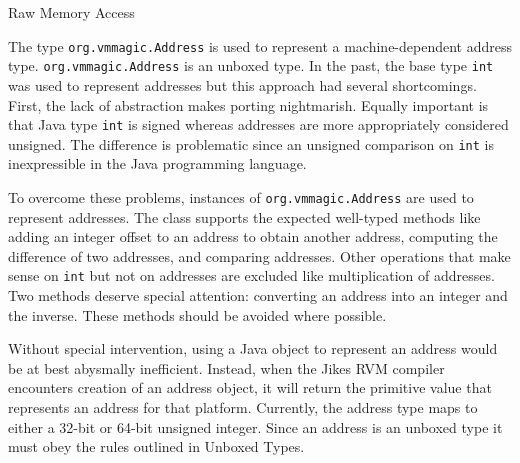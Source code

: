 \begin{section}{Raw Memory Access}
\label{sec:rawmemoryaccess}

The type \verb+org.vmmagic.Address+ is used to represent a machine-dependent address type. \verb+org.vmmagic.Address+ is an unboxed type. In the past, the base type \verb+int+ was used to represent addresses but this approach had several shortcomings. First, the lack of abstraction makes porting nightmarish. Equally important is that Java type \verb+int+ is signed whereas addresses are more appropriately considered unsigned. The difference is problematic since an unsigned comparison on \verb+int+ is inexpressible in the Java programming language.

To overcome these problems, instances of \verb+org.vmmagic.Address+ are used to represent addresses. The class supports the expected well-typed methods like adding an integer offset to an address to obtain another address, computing the difference of two addresses, and comparing addresses. Other operations that make sense on \verb+int+ but not on addresses are excluded like multiplication of addresses. Two methods deserve special attention: converting an address into an integer and the inverse. These methods should be avoided where possible.

Without special intervention, using a Java object to represent an address would be at best abysmally inefficient. Instead, when the Jikes RVM compiler encounters creation of an address object, it will return the primitive value that represents an address for that platform. Currently, the address type maps to either a 32-bit or 64-bit unsigned integer. Since an address is an unboxed type it must obey the rules outlined in Unboxed Types.

\end{section}